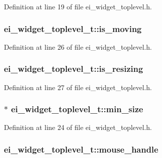 Definition at line 19 of file ei\-\_\-widget\-\_\-toplevel.\-h.

\hypertarget{structei__widget__toplevel__t_afb3d20f90a5fcb74aa165cd4ed809c84}{
\subsubsection[{is\-\_\-moving}]{ ei\-\_\-widget\-\_\-toplevel\-\_\-t\-::is\-\_\-moving}}\label{structei__widget__toplevel__t_afb3d20f90a5fcb74aa165cd4ed809c84}


Definition at line 26 of file ei\-\_\-widget\-\_\-toplevel.\-h.

\hypertarget{structei__widget__toplevel__t_ab2b3a8a4eb570dce16b3c153d2db8bad}{
\subsubsection[{is\-\_\-resizing}]{ ei\-\_\-widget\-\_\-toplevel\-\_\-t\-::is\-\_\-resizing}}\label{structei__widget__toplevel__t_ab2b3a8a4eb570dce16b3c153d2db8bad}


Definition at line 27 of file ei\-\_\-widget\-\_\-toplevel.\-h.

\hypertarget{structei__widget__toplevel__t_afe0e3eb72d1504e32f13a163a51d5149}{
\subsubsection[{min\-\_\-size}]{$\ast$ ei\-\_\-widget\-\_\-toplevel\-\_\-t\-::min\-\_\-size}}\label{structei__widget__toplevel__t_afe0e3eb72d1504e32f13a163a51d5149}


Definition at line 24 of file ei\-\_\-widget\-\_\-toplevel.\-h.

\hypertarget{structei__widget__toplevel__t_a09141dc307e150d83b8cbd79e05d69a1}{
\subsubsection[{mouse\-\_\-handle}]{ ei\-\_\-widget\-\_\-toplevel\-\_\-t\-::mouse\-\_\-handle}}\label{structei__widget__toplevel__t_a09141dc307e150d83b8cbd79e05d69a1}


